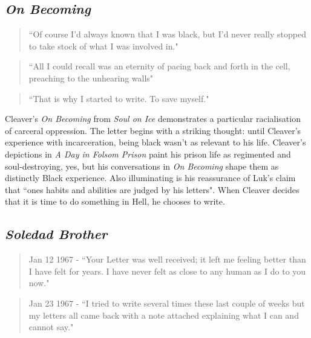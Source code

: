 \documentclass[14pt, letterpaper]{report}
\begin{document}
	\subsection*{\textit{On Becoming}}
	
	\begin{quote}
	``Of course I'd always known that I was black, but I'd never really 
	stopped to take stock of what I was involved in."\autocite[3]{soul-on-ice}
	\end{quote}		
	
	\begin{quote}
	``All I could recall was an eternity of pacing back and forth in 
	the cell, preaching to the unhearing walls"\autocite[11]{soul-on-ice}
	\end{quote}
	
	\begin{quote}
	``That is why I started to write. To save myself."\autocite[15]{soul-on-ice}
	\end{quote}
	
	Cleaver's \textit{On Becoming} from \textit{Soul on Ice} demonstrates a
	particular racialisation of carceral oppression. The letter begins with 
	a striking thought: until Cleaver's experience with incarceration, being 
	black wasn't as relevant to his life. Cleaver's depictions in \textit{A 
	Day in Folsom Prison} paint his prison life as regimented and soul-destroying, 
	yes, but his conversations in \textit{On Becoming} shape them as distinctly 
	Black experience. Also illuminating is his reassurance of Luk's claim that 
	``ones habits and abilities are judged by his letters".\autocite[2]{life-of-paper}
	When Cleaver decides that it is time to do something in Hell, he chooses to 
	write.
	
	\subsection*{\textit{Soledad Brother}}
	
	\begin{quote}
	Jan 12 1967 - ``Your Letter was well received; it left me feeling better 
	than I have felt for years. I have never felt as close to any human as I 
	do to you now."\autocite[99]{soledad-brother}
	\end{quote}
	
	\begin{quote}
	Jan 23 1967 - ``I tried to write several times these last couple of weeks 
	but my letters all came back with a note attached explaining what I can and 
	cannot say."\autocite[101]{soledad-brother}
	\end{quote}
\end{document}
